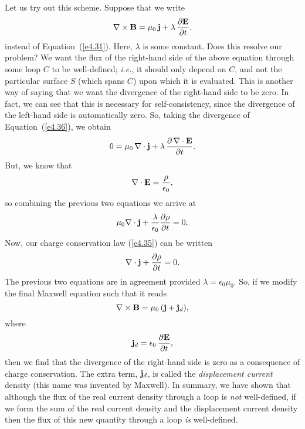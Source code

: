 Let us try out this scheme. Suppose that we write
\begin{equation}\label{e4.36}
\nabla\times{\bf B} = \mu_0\, {\bf j} +\lambda\,\frac{\partial {\bf E}}{\partial t},
\end{equation}
instead of Equation~(\ref{e4.31}). Here, $\lambda$ is some constant. Does this resolve
our problem? We want  the flux of the right-hand side of the
above equation through some loop $C$ to be  well-defined; {\em i.e.}, it should only
depend on $C$, and not the particular surface $S$ (which spans $C$) upon which
it is evaluated. This is another way of saying that we want the divergence of
the right-hand side to be zero. In fact, we can see that
this is necessary for self-consistency, since the divergence of the left-hand side
is automatically zero. So, taking the divergence of Equation~(\ref{e4.36}), we obtain
\begin{equation}
0= \mu_0 \,\nabla\cdot{\bf j} +\lambda \,\frac{\partial\,
 \nabla\cdot{\bf E}}{\partial t}.
\end{equation}
But, we know that
\begin{equation}
\nabla\cdot{\bf E} = \frac{\rho}{\epsilon_0},
\end{equation}
so combining the previous two equations we arrive at
\begin{equation}
\mu_0 \nabla\cdot{\bf j} + \frac{\lambda}{\epsilon_0} \frac{\partial\rho}{\partial t}
=0.
\end{equation}
Now, our charge conservation law (\ref{e4.35})  can be written
\begin{equation}
\nabla\cdot{\bf j} +\frac{\partial\rho}{\partial t} = 0.
\end{equation}
The previous two equations are in agreement  provided
 $\lambda = \epsilon_0\mu_0$. So, if we modify the final Maxwell equation
such that it reads
\begin{equation}\label{e4.41}
\nabla\times{\bf B} = \mu_0 \,({\bf j} +{\bf j}_d),
\end{equation}
where
\begin{equation}
{\bf j}_d = \epsilon_0\,\frac{\partial{\bf E}}{\partial t},
\end{equation}
then we find that the divergence of the right-hand side is
 zero as a consequence
of charge conservation. The extra term, ${\bf j}_d$, 
is called the {\em displacement current}\/ density (this name was invented by Maxwell).
In summary, we have shown that although the flux of the real current density through a loop is
{\em not}\/ well-defined,  if we form the sum of the real current density and the displacement
current density  then the flux of this new quantity through a  loop {\em is} well-defined. 

